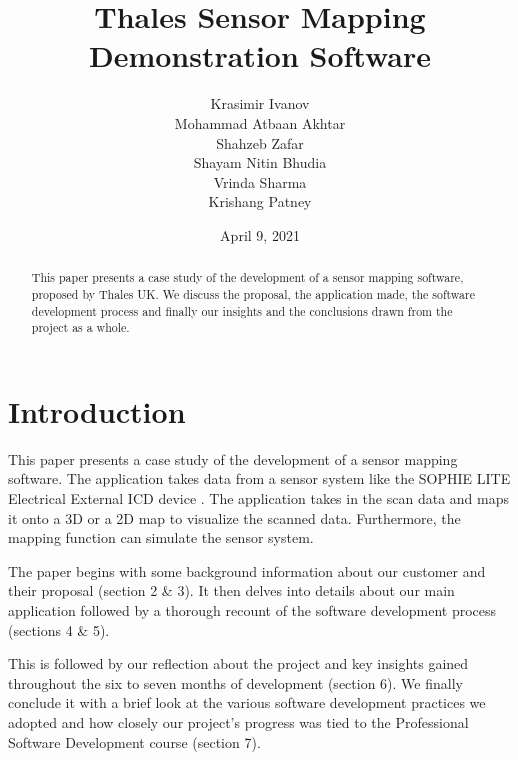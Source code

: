 \documentclass{l3proj}
\begin{document}
\title{Thales Sensor Mapping Demonstration Software}

    \author{Krasimir Ivanov\\
        Mohammad Atbaan Akhtar \\
        Shahzeb Zafar \\
        Shayam Nitin Bhudia \\
        Vrinda Sharma\\ 
        Krishang Patney\\}

\date{April 9, 2021}

\maketitle

\begin{abstract}

    This paper presents a case study of the development of a sensor mapping software, proposed by Thales UK. We discuss the proposal, the application made, the software development process and finally our insights and the conclusions drawn from the project as a whole.

\end{abstract}

\educationalconsent

\newpage

\section{Introduction}

This paper presents a case study of the development of a sensor mapping software. The application takes data from a sensor system like the SOPHIE LITE Electrical External ICD device \cite{sophie}. The application takes in the scan data and maps it onto a 3D or a 2D map to visualize the scanned data. Furthermore, the mapping function can simulate the sensor system.

The paper begins with some background information about our customer and their proposal (section 2 \& 3). It then delves into details about our main application followed by a thorough recount of the software development process (sections 4 \& 5). 

This is followed by our reflection about the project and key insights gained throughout the six to seven months of development (section 6). We finally conclude it with a brief look at the various software development practices we adopted and how closely our project’s progress was tied to the Professional Software Development course (section 7).
\end{document}
